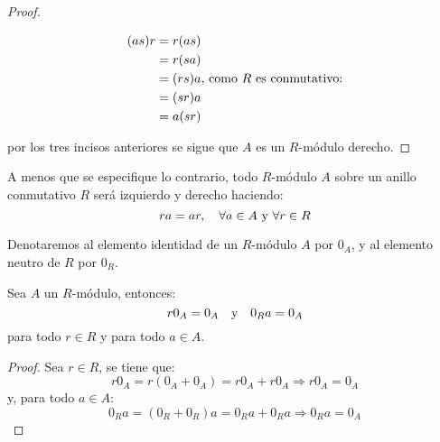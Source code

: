 \documentclass[12pt]{report}
\newcounter{it}
\theoremstyle{largebreak}
\begin{document}
\begin{proof}
\begin{enumerate}[label=\textit{(\arabic*)}]
\begin{equation*}
                \begin{split}
                    (as)r&=r(as)\\
                    &=r(sa)\\
                    &=(rs)a\textup{, como $R$ es conmutativo:} \\
                    &=(sr)a\\
                    &=a(sr)\\
                \end{split}
            \end{equation*}
        \end{enumerate}
        por los tres incisos anteriores se sigue que $A$ es un $R$-módulo derecho.
    \end{proof}

    \begin{obs}
        A menos que se especifique lo contrario, todo $R$-módulo $A$ sobre un anillo conmutativo $R$ será izquierdo y derecho haciendo:
        \begin{equation*}
            ra=ar,\quad\forall a\in A\textup{ y }\forall r\in R
        \end{equation*}
    \end{obs}

    \begin{obs}
        Denotaremos al elemento identidad de un $R$-módulo $A$ por $0_A$, y al elemento neutro de $R$ por $0_R$.
    \end{obs}

    \begin{propo}
        Sea $A$ un $R$-módulo, entonces:
        \begin{equation*}
            r0_A=0_A\quad\textup{y}\quad 0_Ra=0_A
        \end{equation*}
        para todo $r\in R$ y para todo $a\in A$.
    \end{propo}

    \begin{proof}
        Sea $r\in R$, se tiene que:
        \begin{equation*}
            r0_A=r(0_A+0_A)=r0_A+r0_A\Rightarrow r0_A=0_A
        \end{equation*}
        y, para todo $a\in A$:
        \begin{equation*}
            0_Ra=(0_R+0_R)a=0_Ra+0_Ra\Rightarrow 0_Ra=0_A
        \end{equation*}
    \end{proof}
\end{document}
